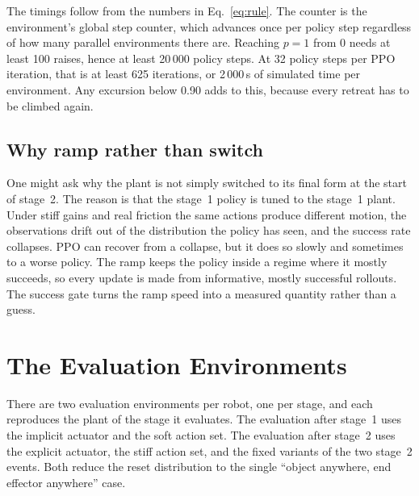 The timings follow from the numbers in Eq.~\eqref{eq:rule}. The counter is the environment's global step counter, which advances once per policy step regardless of how many parallel environments there are. Reaching $p=1$ from 0 needs at least 100 raises, hence at least 20\,000 policy steps. At 32 policy steps per PPO iteration, that is at least 625 iterations, or 2\,000\,s of simulated time per environment. Any excursion below 0.90 adds to this, because every retreat has to be climbed again.

\subsection{Why ramp rather than switch}

One might ask why the plant is not simply switched to its final form at the start of stage~2. The reason is that the stage~1 policy is tuned to the stage~1 plant. Under stiff gains and real friction the same actions produce different motion, the observations drift out of the distribution the policy has seen, and the success rate collapses. PPO can recover from a collapse, but it does so slowly and sometimes to a worse policy. The ramp keeps the policy inside a regime where it mostly succeeds, so every update is made from informative, mostly successful rollouts. The success gate turns the ramp speed into a measured quantity rather than a guess.

\section{The Evaluation Environments}
\label{sec:eval}

There are two evaluation environments per robot, one per stage, and each reproduces the plant of the stage it evaluates. The evaluation after stage~1 uses the implicit actuator and the soft action set. The evaluation after stage~2 uses the explicit actuator, the stiff action set, and the fixed variants of the two stage~2 events. Both reduce the reset distribution to the single ``object anywhere, end effector anywhere'' case.

